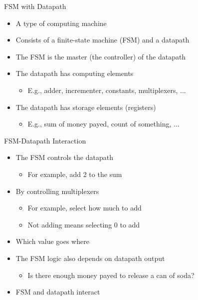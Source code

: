 
\begin{frame}[fragile]{FSM with Datapath}
\begin{itemize}
\item A type of computing machine
\item Consists of a finite-state machine (FSM) and a datapath
\item The FSM is the master (the controller) of the datapath
\item The datapath has computing elements
\begin{itemize}
\item E.g., adder, incrementer, constants, multiplexers, ...
\end{itemize}
\item The datapath has storage elements (registers)
\begin{itemize}
\item E.g., sum of money payed, count of something, ...
\end{itemize}
\end{itemize}
\end{frame}

\begin{frame}[fragile]{FSM-Datapath Interaction}
\begin{itemize}
\item The FSM controls the datapath
\begin{itemize}
\item For example, add 2 to the sum
\end{itemize}
\item By controlling multiplexers
\begin{itemize}
\item For example, select how much to add
\item Not adding means selecting 0 to add
\end{itemize}
\item Which value goes where
\item The FSM logic also depends on datapath output
\begin{itemize}
\item Is there enough money payed to release a can of soda?
\end{itemize}
\item FSM and datapath interact
\end{itemize}
\end{frame}


